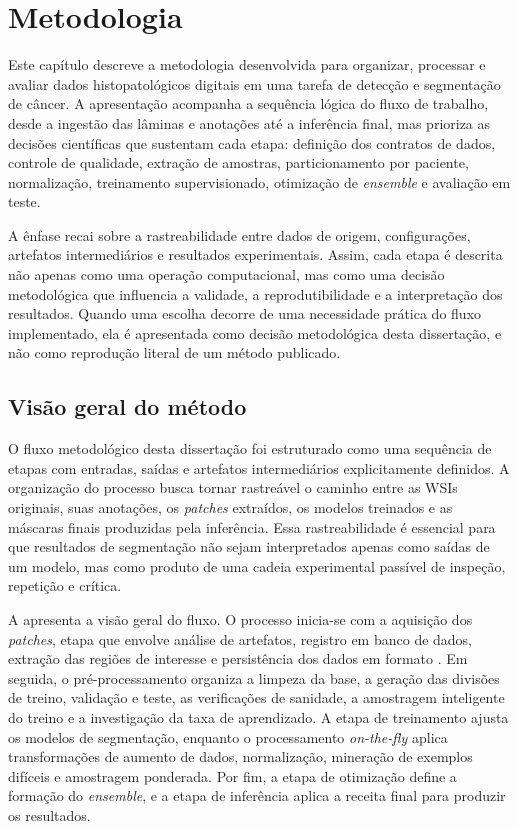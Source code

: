 \chapter{Metodologia}\label{chp:desenvolvimento}

Este capítulo descreve a metodologia desenvolvida para organizar, processar e
avaliar dados histopatológicos digitais em uma tarefa de detecção e segmentação
de câncer. A apresentação acompanha a sequência lógica do fluxo de trabalho,
desde a ingestão das lâminas e anotações até a inferência final, mas prioriza as
decisões científicas que sustentam cada etapa: definição dos contratos de dados,
controle de qualidade, extração de amostras, particionamento por paciente,
normalização, treinamento supervisionado, otimização de \textit{ensemble} e
avaliação em teste.

A ênfase recai sobre a rastreabilidade entre dados de origem, configurações,
artefatos intermediários e resultados experimentais. Assim, cada etapa é
descrita não apenas como uma operação computacional, mas como uma decisão
metodológica que influencia a validade, a reprodutibilidade e a interpretação
dos resultados. Quando uma escolha decorre de uma necessidade prática do fluxo
implementado, ela é apresentada como decisão metodológica desta dissertação, e não como reprodução literal de um método publicado.

\section{Visão geral do método}\label{sec:met_visao_geral}

O fluxo metodológico desta dissertação foi estruturado como uma sequência de etapas com entradas, saídas e artefatos intermediários explicitamente definidos.
A organização do processo busca tornar rastreável o caminho entre as WSIs originais, suas anotações, os \textit{patches} extraídos, os modelos treinados e as máscaras finais produzidas pela inferência. Essa rastreabilidade é essencial
para que resultados de segmentação não sejam interpretados apenas como saídas de um modelo, mas como produto de uma cadeia experimental passível de inspeção, repetição e crítica.

A  apresenta a visão geral do fluxo. O processo inicia-se com a aquisição dos \textit{patches}, etapa que envolve análise de artefatos,
registro em banco de dados, extração das regiões de interesse e persistência dos dados em formato . Em seguida, o pré-processamento organiza a limpeza da base,
a geração das divisões de treino, validação e teste, as verificações de sanidade, a amostragem inteligente do treino e a investigação da taxa de aprendizado. A etapa de treinamento ajusta os modelos de segmentação, enquanto o processamento \textit{on-the-fly} aplica transformações de aumento de dados, normalização, mineração de exemplos difíceis e amostragem ponderada.
Por fim, a etapa de otimização define a formação do \textit{ensemble}, e a etapa de inferência aplica a receita final para produzir os resultados.

